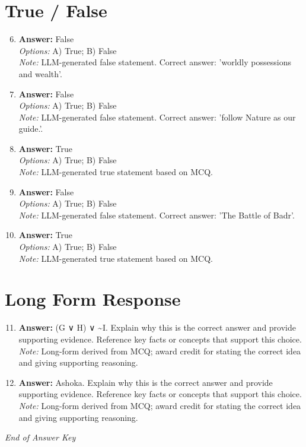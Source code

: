 \documentclass[12pt]{article}
\begin{document}
\section*{True / False}
\begin{enumerate}[label=\arabic*.]
\setcounter{enumi}{5}
\item \textbf{Answer:} False
\\ \textit{Options:} A) True; B) False
\\ \textit{Note:} LLM-generated false statement. Correct answer: 'worldly possessions and wealth'.
\item \textbf{Answer:} False
\\ \textit{Options:} A) True; B) False
\\ \textit{Note:} LLM-generated false statement. Correct answer: 'follow Nature as our guide.'.
\item \textbf{Answer:} True
\\ \textit{Options:} A) True; B) False
\\ \textit{Note:} LLM-generated true statement based on MCQ.
\item \textbf{Answer:} False
\\ \textit{Options:} A) True; B) False
\\ \textit{Note:} LLM-generated false statement. Correct answer: 'The Battle of Badr'.
\item \textbf{Answer:} True
\\ \textit{Options:} A) True; B) False
\\ \textit{Note:} LLM-generated true statement based on MCQ.
\end{enumerate}

\section*{Long Form Response}
\begin{enumerate}[label=\arabic*.]
\setcounter{enumi}{10}
\item \textbf{Answer:} (G ∨ H) ∨ \textasciitilde{}I. Explain why this is the correct answer and provide supporting evidence. Reference key facts or concepts that support this choice.
\\ \textit{Note:} Long-form derived from MCQ; award credit for stating the correct idea and giving supporting reasoning.
\item \textbf{Answer:} Ashoka. Explain why this is the correct answer and provide supporting evidence. Reference key facts or concepts that support this choice.
\\ \textit{Note:} Long-form derived from MCQ; award credit for stating the correct idea and giving supporting reasoning.
\end{enumerate}

\vfill
\noindent\textit{End of Answer Key}
\end{document}
